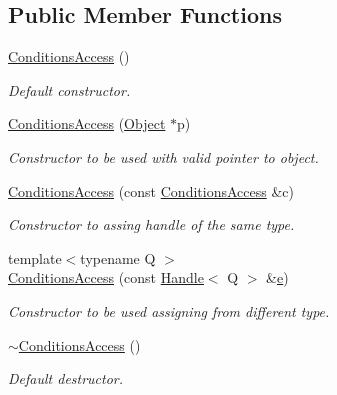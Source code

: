 \subsection*{Public Member Functions}
\begin{DoxyCompactItemize}
\item 
\hyperlink{class_d_d4hep_1_1_conditions_1_1_conditions_access_a837aa2f7c771e192a535024a1fc2f10a}{Conditions\+Access} ()
\begin{DoxyCompactList}\small\item\em Default constructor. \end{DoxyCompactList}\item 
\hyperlink{class_d_d4hep_1_1_conditions_1_1_conditions_access_a1f9e4b69121bbb7416bce5086bab7e9c}{Conditions\+Access} (\hyperlink{class_d_d4hep_1_1_conditions_1_1_conditions_access_a5d82a416d51349abaf6075b2028faecc}{Object} $\ast$p)
\begin{DoxyCompactList}\small\item\em Constructor to be used with valid pointer to object. \end{DoxyCompactList}\item 
\hyperlink{class_d_d4hep_1_1_conditions_1_1_conditions_access_a39e09b1816f8a9e0cfc63815356a44fb}{Conditions\+Access} (const \hyperlink{class_d_d4hep_1_1_conditions_1_1_conditions_access}{Conditions\+Access} \&c)
\begin{DoxyCompactList}\small\item\em Constructor to assing handle of the same type. \end{DoxyCompactList}\item 
{\footnotesize template$<$typename Q $>$ }\\\hyperlink{class_d_d4hep_1_1_conditions_1_1_conditions_access_a0807e34c93de398b31526a30f1028e44}{Conditions\+Access} (const \hyperlink{class_d_d4hep_1_1_handle}{Handle}$<$ Q $>$ \&\hyperlink{_volumes_8cpp_a8a9a1f93e9b09afccaec215310e64142}{e})
\begin{DoxyCompactList}\small\item\em Constructor to be used assigning from different type. \end{DoxyCompactList}\item 
\hyperlink{class_d_d4hep_1_1_conditions_1_1_conditions_access_ab654b88bad13706fd78d4a92c1ba0eb4}{$\sim$\+Conditions\+Access} ()
\begin{DoxyCompactList}\small\item\em Default destructor. \end{DoxyCompactList}\item 

\end{DoxyCompactItemize}
